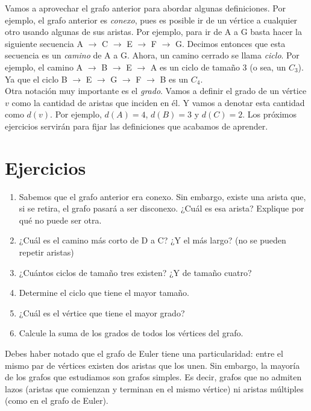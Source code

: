 \documentclass[11pt]{scrartcl}
\begin{document}
Vamos a aprovechar el grafo anterior para abordar algunas definiciones. Por ejemplo, el grafo anterior es \textit{ conexo}, pues es posible ir de un vértice a cualquier otro usando algunas de sus aristas. Por ejemplo, para ir de A a G basta hacer la siguiente secuencia A $\rightarrow$ C $\rightarrow$ E $\rightarrow$ F $\rightarrow$ G. Decimos entonces que esta secuencia es un \textit{ camino} de A a G. Ahora, un camino cerrado se llama \textit{ ciclo}. Por ejemplo, el camino A $\rightarrow$ B $\rightarrow$ E $\rightarrow$ A es un ciclo de tamaño 3 (o sea, un $C_3$). Ya que el ciclo B $\rightarrow$ E $\rightarrow$ G $\rightarrow$ F $\rightarrow$ B es un $C_4$.\\

Otra notación muy importante es el \textit{ grado}. Vamos a definir el grado de un vértice $v$ como la cantidad de aristas que inciden en él. Y vamos a denotar esta cantidad como $d(v)$. Por ejemplo, $d(A) = 4$, $d(B) = 3$ y $d(C) = 2$. Los próximos ejercicios servirán para fijar las definiciones que acabamos de aprender.

\section{Ejercicios}
\begin{enumerate}
    \item Sabemos que el grafo anterior era conexo. Sin embargo, existe una arista que, si se retira, el grafo pasará a ser disconexo. ¿Cuál es esa arista? Explique por qué no puede ser otra.
    \item ¿Cuál es el camino más corto de D a C? ¿Y el más largo? (no se pueden repetir aristas)
    \item ¿Cuántos ciclos de tamaño tres existen? ¿Y de tamaño cuatro?
    \item Determine el ciclo que tiene el mayor tamaño.
    \item ¿Cuál es el vértice que tiene el mayor grado?
    \item Calcule la suma de los grados de todos los vértices del grafo.
\end{enumerate}

Debes haber notado que el grafo de Euler tiene una particularidad: entre el mismo par de vértices existen dos aristas que los unen. Sin embargo, la mayoría de los grafos que estudiamos son grafos simples. Es decir, grafos que no admiten lazos (aristas que comienzan y terminan en el mismo vértice) ni aristas múltiples (como en el grafo de Euler).\\
\end{document}
